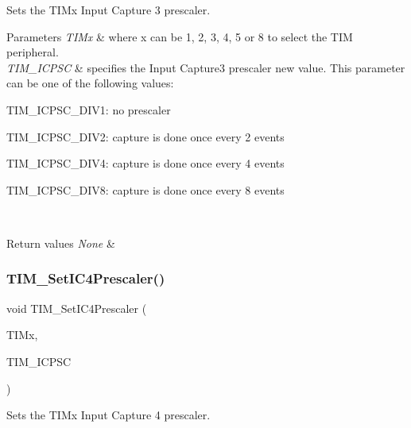 Sets the T\+I\+Mx Input Capture 3 prescaler. 


\begin{DoxyParams}{Parameters}
{\em T\+I\+Mx} & where x can be 1, 2, 3, 4, 5 or 8 to select the T\+IM peripheral. \\
\hline
{\em T\+I\+M\+\_\+\+I\+C\+P\+SC} & specifies the Input Capture3 prescaler new value. This parameter can be one of the following values\+: \begin{DoxyItemize}
\item T\+I\+M\+\_\+\+I\+C\+P\+S\+C\+\_\+\+D\+I\+V1\+: no prescaler \item T\+I\+M\+\_\+\+I\+C\+P\+S\+C\+\_\+\+D\+I\+V2\+: capture is done once every 2 events \item T\+I\+M\+\_\+\+I\+C\+P\+S\+C\+\_\+\+D\+I\+V4\+: capture is done once every 4 events \item T\+I\+M\+\_\+\+I\+C\+P\+S\+C\+\_\+\+D\+I\+V8\+: capture is done once every 8 events \end{DoxyItemize}
\\
\hline
\end{DoxyParams}

\begin{DoxyRetVals}{Return values}
{\em None} & \\
\hline
\end{DoxyRetVals}
\mbox{\label{group___t_i_m___private___functions_ga0f2c784271356d6b64b8c0da64dbdbc2}} 
\subsubsection{\texorpdfstring{TIM\_SetIC4Prescaler()}{TIM\_SetIC4Prescaler()}}
{\footnotesize\ttfamily void T\+I\+M\+\_\+\+Set\+I\+C4\+Prescaler (\begin{DoxyParamCaption}\item[{\mbox{\hyperlink{struct_t_i_m___type_def}{T\+I\+M\+\_\+\+Type\+Def}} $\ast$}]{T\+I\+Mx,  }\item[{uint16\+\_\+t}]{T\+I\+M\+\_\+\+I\+C\+P\+SC }\end{DoxyParamCaption})}



Sets the T\+I\+Mx Input Capture 4 prescaler. 


